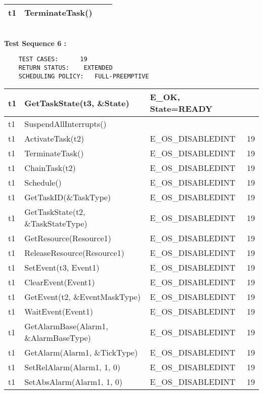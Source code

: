 \documentclass[10pt]{article}
\newlength{\Li}\settowidth{\Li}{Running}
\newlength{\Lii}\setlength{\Lii}{7cm}
\newlength{\Liiii}\setlength{\Liiii}{0.9cm}
\newlength{\Liii}\setlength{\Liii}{\textwidth} \addtolength{\Liii}{-\Li} \addtolength{\Liii}{-\Lii} \addtolength{\Liii}{-\Liiii}
\begin{document}
\begin{supertabular}{|p{\Li}|p{\Lii}|p{\Liii}|p{\Liiii}|}
	t1	& TerminateTask()								& 	 				& \\ \hline
	\end{supertabular} \\
	
	\textbf{Test Sequence 6 :}\\
	\begin{lstlisting}
	TEST CASES:		 19
	RETURN STATUS:	  EXTENDED
	SCHEDULING POLICY:   FULL-PREEMPTIVE
	\end{lstlisting}
	
	
	\begin{supertabular}{|p{\Li}|p{\Lii}|p{\Liii}|p{\Liiii}|} \hline 
	t1	& GetTaskState(t3, \&State)						& E\_OK, State=READY	& \\ \hline
	t1	& SuspendAllInterrupts()							& 	 				& \\ \hline
	t1	& ActivateTask(t2)								& E\_OS\_DISABLEDINT	& 19 \\ \hline
	t1	& TerminateTask()								& E\_OS\_DISABLEDINT	& 19 \\ \hline
	t1	& ChainTask(t2)								& E\_OS\_DISABLEDINT	& 19 \\ \hline
	t1	& Schedule()									& E\_OS\_DISABLEDINT	& 19 \\ \hline
	t1	& GetTaskID(\&TaskType)							& E\_OS\_DISABLEDINT	& 19 \\ \hline
	t1	& GetTaskState(t2, \&TaskStateType)				& E\_OS\_DISABLEDINT	& 19 \\ \hline
	t1	& GetResource(Resource1)						& E\_OS\_DISABLEDINT	& 19 \\ \hline
	t1	& ReleaseResource(Resource1)					& E\_OS\_DISABLEDINT	& 19 \\ \hline
	t1	& SetEvent(t3, Event1)							& E\_OS\_DISABLEDINT	& 19 \\ \hline
	t1	& ClearEvent(Event1)							& E\_OS\_DISABLEDINT	& 19 \\ \hline
	t1	& GetEvent(t2, \&EventMaskType)					& E\_OS\_DISABLEDINT	& 19 \\ \hline
	t1	& WaitEvent(Event1)								& E\_OS\_DISABLEDINT	& 19 \\ \hline
	t1	& GetAlarmBase(Alarm1, \&AlarmBaseType)			& E\_OS\_DISABLEDINT	& 19 \\ \hline
	t1	& GetAlarm(Alarm1, \&TickType)					& E\_OS\_DISABLEDINT	& 19 \\ \hline
	t1	& SetRelAlarm(Alarm1, 1, 0)						& E\_OS\_DISABLEDINT	& 19 \\ \hline
	t1	& SetAbsAlarm(Alarm1, 1, 0)						& E\_OS\_DISABLEDINT	& 19 \\ \hline

\end{supertabular}
\end{document}

